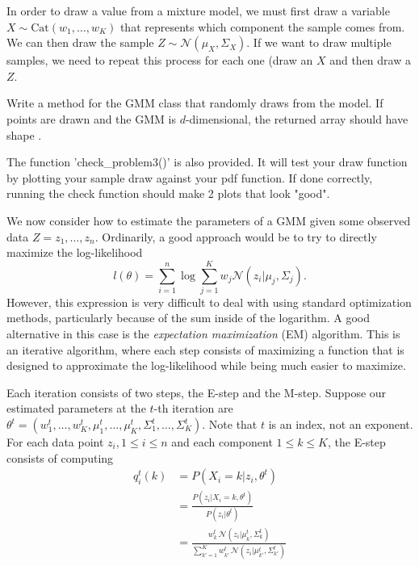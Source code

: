 In order to draw a value from a mixture model, we must first draw a variable \(X \sim \mathrm{Cat}(w_1,\ldots, w_K)\) that represents which component the sample comes from.
We can then draw the sample \(Z\sim \mathcal{N}(\mu_X, \Sigma_X)\).
If we want to draw multiple samples, we need to repeat this process for each one (draw an \(X\) and then draw a \(Z\).

\begin{problem}
Write a method  for the GMM class that randomly draws from the model.
If  points are drawn and the GMM is \(d\)-dimensional, the returned array should have shape .

The function 'check\_problem3()' is also provided. It will test your draw function by plotting your sample draw against your pdf function. If done correctly, running the check function should make 2 plots that look "good".
\end{problem}

We now consider how to estimate the parameters of a GMM given some observed data \(Z = z_1,\ldots, z_n\).
Ordinarily, a good approach would be to try to directly maximize the log-likelihood
\[
l(\theta)=\sum_{i=1}^n\log\sum_{j=1}^Kw_{j} \mathcal{N}(z_i | \mu_{j}, \Sigma_{j}).
\]
However, this expression is very difficult to deal with using standard optimization methods, particularly because of the sum inside of the logarithm.
A good alternative in this case is the \emph{expectation maximization} (EM) algorithm.
This is an iterative algorithm, where each step consists of maximizing a function that is designed to approximate the log-likelihood while being much easier to maximize.

Each iteration consists of two steps, the E-step and the M-step.
Suppose our estimated parameters at the \(t\)-th iteration are \(\theta^t=\left(w_1^t,\ldots,w_K^t, \mu_1^t,\ldots,\mu_K^t,\Sigma_1^t,\ldots,\Sigma_K^t\right)\).
Note that \(t\) is an index, not an exponent.
For each data point \(z_i, 1\leq i \leq n\) and each component \(1\leq k\leq K\), the E-step consists of computing
\begin{align*}
q_i^t(k) &=
P(X_i=k | z_i, \theta^t)
\\
&=
\frac{P(z_i|X_i=k,\theta^t)}{P(z_i|\theta^t)}
\\
&= 
\frac{
w_k^t \,\mathcal{N}(z_i| \mu_k^t,\Sigma_k^t)
}{
\sum_{k'=1}^K
w_{k'}^t \,\mathcal{N}(z_i| \mu_{k'}^t,\Sigma_{k'}^t)
}
\end{align*}

